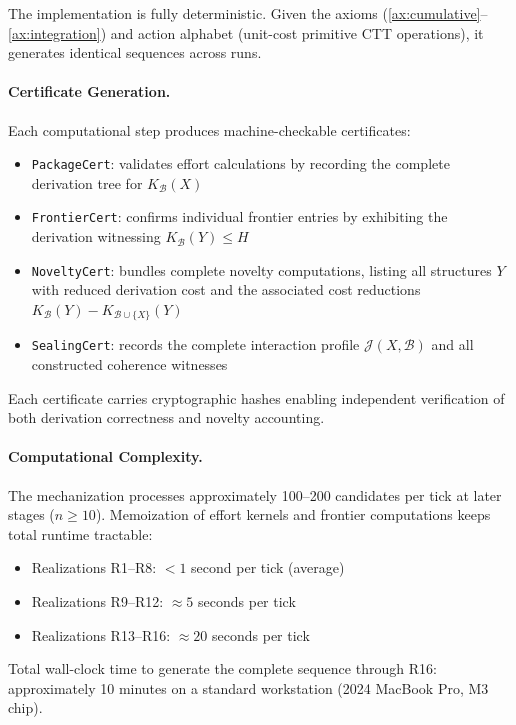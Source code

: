 \documentclass[11pt]{article}
\theoremstyle{definition}
\theoremstyle{remark}
\begin{document}
The implementation is fully deterministic. Given the axioms (\cref{ax:cumulative}--\cref{ax:integration}) and action alphabet (unit-cost primitive CTT operations), it generates identical sequences across runs.

\paragraph{Certificate Generation.}

Each computational step produces machine-checkable certificates:

\begin{itemize}
\item \texttt{PackageCert}: validates effort calculations by recording the complete derivation tree for $K_{\mathcal{B}}(X)$
\item \texttt{FrontierCert}: confirms individual frontier entries by exhibiting the derivation witnessing $K_{\mathcal{B}}(Y) \leq H$
\item \texttt{NoveltyCert}: bundles complete novelty computations, listing all structures $Y$ with reduced derivation cost and the associated cost reductions $K_{\mathcal{B}}(Y) - K_{\mathcal{B} \cup \{X\}}(Y)$
\item \texttt{SealingCert}: records the complete interaction profile $\mathcal{J}(X, \mathcal{B})$ and all constructed coherence witnesses
\end{itemize}

Each certificate carries cryptographic hashes enabling independent verification of both derivation correctness and novelty accounting.

\paragraph{Computational Complexity.}

The mechanization processes approximately 100--200 candidates per tick at later stages ($n \geq 10$). Memoization of effort kernels and frontier computations keeps total runtime tractable:
\begin{itemize}
\item Realizations R1--R8: $< 1$ second per tick (average)
\item Realizations R9--R12: $\approx 5$ seconds per tick
\item Realizations R13--R16: $\approx 20$ seconds per tick
\end{itemize}

Total wall-clock time to generate the complete sequence through R16: approximately 10 minutes on a standard workstation (2024 MacBook Pro, M3 chip).
\end{document}
